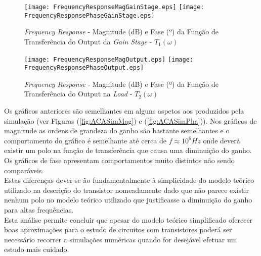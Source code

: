 \begin{figure}[H]
    \centering
    \texttt{[image: FrequencyResponseMagGainStage.eps]}
    \texttt{[image: FrequencyResponsePhaseGainStage.eps]}
    \caption{\emph{Frequency Response} - Magnitude (dB) e Fase (º) da Função de Transferência do Output da \emph{Gain Stage} - $T_1(\omega)$}
    \label{fig:FrequencyResponseAnaGainStage}
\end{figure}

\begin{figure}[H]
    \centering
    \texttt{[image: FrequencyResponseMagOutput.eps]}
    \texttt{[image: FrequencyResponsePhaseOutput.eps]}
    \caption{\emph{Frequency Response} - Magnitude (dB) e Fase (º) da Função de Transferência do Output na \emph{Load} - $T_2(\omega)$}
    \label{fig:FrequencyResponseAnaOutput}
\end{figure}

Os gráficos anteriores são semelhantes em alguns aspetos aos produzidos pela simulação (ver Figuras (\ref{fig:ACASimMag}) e (\ref{fig:ACASimPha})).
Nos gráficos de magnitude as ordens de grandeza do ganho são bastante semelhantes e o comportamento do gráfico é semelhante até cerca de $f \approx 10^6 Hz$
onde deverá existir um polo na função de transferência que causa uma diminuição do ganho. 
\\
Os gráficos de fase apresentam comportamentos muito distintos não sendo comparáveis.
\\
Estas diferenças dever-se-ão fundamentalmente à simplicidade do modelo teórico utilizado na descrição do transistor nomeadamente dado que 
não parece existir nenhum polo no modelo teórico utilizado que justificasse a diminuição do ganho para altas frequências.
\\
Esta análise permite concluir que apesar do modelo teórico simplificado oferecer boas aproximações para o estudo de circuitos com transistores
poderá ser necessário recorrer a simulações numéricas quando for desejável efetuar um estudo mais cuidado.